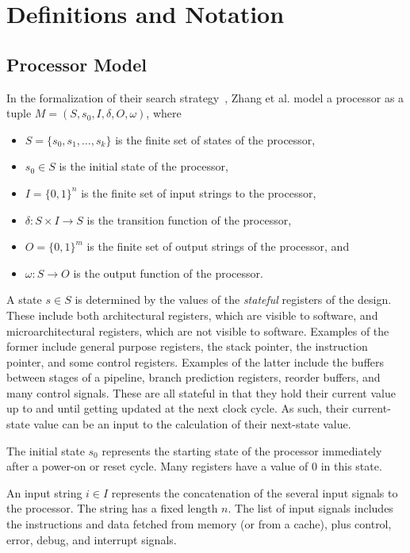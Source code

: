 \section{Definitions and Notation}
\subsection{Processor Model}
\label{sec:procmodel}
In the formalization of their search strategy~\cite{zhang2018recursive}, Zhang et
al. model a processor as a tuple $M = (S, s_0, I, \delta, O, \omega)$, where
\begin{itemize}
  \item $S = \{s_0, s_1, \ldots, s_k\}$ is the finite set of states of the
    processor,
  \item $s_0 \in S$ is the initial state of the processor,
  \item $I = \{0,1\}^n$ is the finite set of input strings to the processor,
  \item $\delta: S \times I \rightarrow S$ is the transition function of the processor,
  \item $O = \{0,1\}^m$ is the finite set of output strings of the processor,
    and
  \item $\omega: S \rightarrow O$ is the output function of the processor.
\end{itemize}

A state $s \in S$ is determined by the values of the \emph{stateful} registers
of the design. These include both architectural registers, which are visible to
software, and microarchitectural registers, which are not visible to
software. Examples of the former include general purpose registers, the stack
pointer, the instruction pointer, and some control registers. Examples of the
latter include the buffers between stages of a pipeline, branch prediction
registers, reorder buffers, and many control signals. These are all stateful in that
they hold their current value up to and until getting updated at the next clock
cycle. As such, their current-state value can be an input to the calculation of their
next-state value. 

The initial state $s_0$ represents the starting state of the processor
immediately after a
power-on or reset cycle. Many registers have a value of 0 in this state.

An input string $i \in I$ represents the concatenation of the several input
signals to the processor. The string has a fixed length $n$. The list of input
signals includes the instructions and data fetched from memory (or from a
cache), plus control, error, debug, and interrupt signals.

